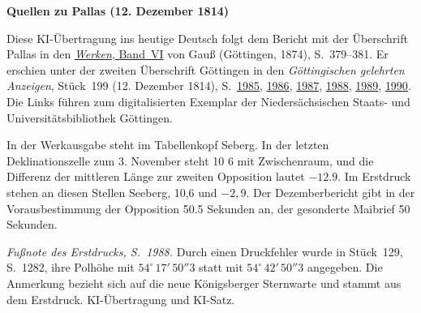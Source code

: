 \clearpage\thispagestyle{empty}
\begin{center}\textbf{Quellen zu Pallas (12. Dezember 1814)}\end{center}
\noindent Diese KI-Übertragung ins heutige Deutsch folgt dem Bericht mit der Überschrift Pallas in den \href{https://gdz.sub.uni-goettingen.de/id/PPN236007467}{\textit{Werken}, Band~VI} von Gauß (Göttingen, 1874), S.~379--381. Er erschien unter der zweiten Überschrift Göttingen in den \textit{Göttingischen gelehrten Anzeigen}, Stück~199 (12. Dezember 1814), S.~\href{https://images.p.sub.uni-goettingen.de/iiif/image/gdz:PPN319721507_1814:00001993/full/1600,/0/default.jpg}{1985}, \href{https://images.p.sub.uni-goettingen.de/iiif/image/gdz:PPN319721507_1814:00001994/full/1600,/0/default.jpg}{1986}, \href{https://images.p.sub.uni-goettingen.de/iiif/image/gdz:PPN319721507_1814:00001995/full/1600,/0/default.jpg}{1987}, \href{https://images.p.sub.uni-goettingen.de/iiif/image/gdz:PPN319721507_1814:00001996/full/1600,/0/default.jpg}{1988}, \href{https://images.p.sub.uni-goettingen.de/iiif/image/gdz:PPN319721507_1814:00001997/full/1600,/0/default.jpg}{1989}, \href{https://images.p.sub.uni-goettingen.de/iiif/image/gdz:PPN319721507_1814:00001998/full/1600,/0/default.jpg}{1990}. Die Links führen zum digitalisierten Exemplar der Niedersächsischen Staats- und Universitätsbibliothek Göttingen.
\par\smallskip\noindent In der Werkausgabe steht im Tabellenkopf Seberg. In der letzten Deklinationszelle zum 3. November steht 10 6 mit Zwischenraum, und die Differenz der mittleren Länge zur zweiten Opposition lautet $-12.9$. Im Erstdruck stehen an diesen Stellen Seeberg, 10,6 und $-2{,}9$. Der Dezemberbericht gibt in der Vorausbestimmung der Opposition 50.5 Sekunden an, der gesonderte Maibrief 50 Sekunden.
\par\smallskip\noindent \textit{Fußnote des Erstdrucks, S.~1988.} Durch einen Druckfehler wurde in Stück~129, S.~1282, ihre Polhöhe mit $54^\circ\,17'\,50''3$ statt mit $54^\circ\,42'\,50''3$ angegeben. Die Anmerkung bezieht sich auf die neue Königsberger Sternwarte und stammt aus dem Erstdruck. KI-Übertragung und KI-Satz.
\clearpage

